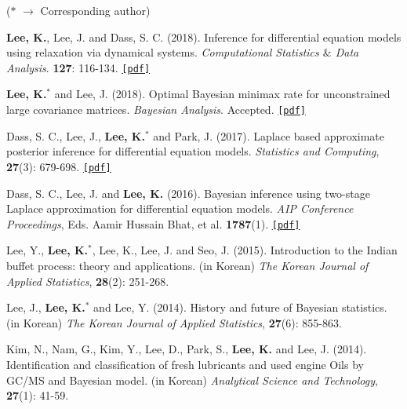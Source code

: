 \documentclass[margin, 10pt]{res} %
\begin{document}
\begin{resume}
\begin{enumerate}[label={[\arabic*]}]
	\item[]{($*$ $\to$ Corresponding author)}
	\item {\bf Lee, K.}, Lee, J. and Dass, S. C. (2018). Inference for differential equation models using relaxation via dynamical systems. {\it Computational Statistics $\&$ Data Analysis}. {\bf 127}: 116-134. \href{https://www.sciencedirect.com/science/article/pii/S0167947318301233}{\texttt{[pdf]}}
	\item {\bf Lee, K.}$^*$ and Lee, J. (2018). Optimal Bayesian minimax rate for unconstrained large covariance matrices. \emph{Bayesian Analysis}. Accepted. \href{https://projecteuclid.org/euclid.ba/1519355083}{\texttt{[pdf]}}
	\item Dass, S. C., Lee, J., {\bf Lee, K.}$^*$ and Park, J. (2017). Laplace based approximate posterior inference for differential equation models. \emph{Statistics and Computing}, {\bf 27}(3): 679-698. \href{https://link.springer.com/article/10.1007/s11222-016-9647-0}{\texttt{[pdf]}}
	\item Dass, S. C., Lee, J. and {\bf Lee, K.} (2016). Bayesian inference using two-stage Laplace approximation for differential equation models. \emph{AIP Conference Proceedings}, Eds. Aamir Hussain Bhat, et al. {\bf 1787}(1). \href{https://leekjstat.files.wordpress.com/2015/12/dass2016bayesian-inference-using-two-stage-laplace-approximation-for-differential-equation-models.pdf}{\texttt{[pdf]}}
	\item Lee, Y., {\bf Lee, K.}$^*$, Lee, K., Lee, J. and Seo, J. (2015). Introduction to the Indian buffet process: theory and applications. (in Korean) \emph{The Korean Journal of Applied Statistics}, {\bf 28}(2): 251-268.
	\item Lee, J., {\bf Lee, K.}$^*$ and Lee, Y. (2014). History and future of Bayesian statistics. (in Korean) \emph{The Korean Journal of Applied Statistics}, {\bf 27}(6): 855-863.
	\item Kim, N., Nam, G., Kim, Y., Lee, D., Park, S., {\bf Lee, K.} and Lee, J. (2014). Identification and classification of fresh lubricants and used engine Oils by GC/MS and Bayesian model. (in Korean) \emph{Analytical Science and Technology}, {\bf 27}(1): 41-59.
\end{enumerate}
\vspace{.2cm}



\end{resume}
\end{document}
